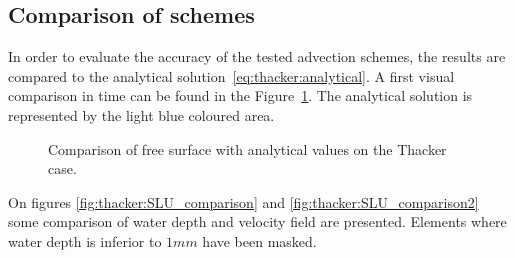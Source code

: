 \subsection{Comparison of schemes}

In order to evaluate the accuracy of the tested advection schemes, the results are compared to the analytical solution~\ref{eq:thacker:analytical}.
A first visual comparison in time can be found in the Figure~\ref{fig:thacker:SLTime}.
The analytical solution is represented by the light blue coloured area.

\begin{figure}[H]
\begin{minipage}[t]{0.5\textwidth}
 \centering
\end{minipage}%
\begin{minipage}[t]{0.5\textwidth}
 \centering
\end{minipage}
\begin{minipage}[t]{0.5\textwidth}
 \centering
\end{minipage}%
\begin{minipage}[t]{0.5\textwidth}
 \centering
\end{minipage}
  \caption{Comparison of free surface with analytical values on the Thacker case.}
  \label{fig:thacker:SLTime}
\end{figure}

On figures \ref{fig:thacker:SLU_comparison} and \ref{fig:thacker:SLU_comparison2}
some comparison of water depth and velocity field are presented. Elements where water depth is inferior to $1mm$ have been masked.

